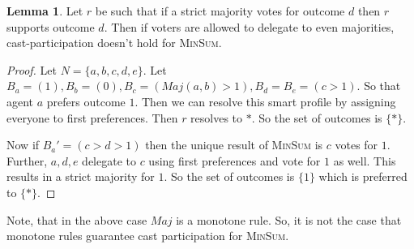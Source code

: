 \documentclass[11pt,a4paper, titlepage]{article}
\theoremstyle{definition}
\newtheorem{lemma}[theorem]{Lemma}
\begin{document}
\begin{lemma}
    Let $r$ be such that if a strict majority votes for outcome $d$ then $r$ supports outcome $d$. Then if voters are allowed to delegate to even majorities, cast-participation doesn't hold for \textsc{MinSum}. 
\end{lemma}

\begin{proof}
    Let $N = \{a, b, c, d, e\}$. Let $B_a = (1), B_b = (0), B_c = (\mathit{Maj}(a, b) > 1), B_d = B_e = (c > 1)$. So that agent $a$ prefers outcome $1$. Then we can resolve this smart profile by assigning everyone to first preferences. Then $r$ resolves to $*$. So the set of outcomes is $\{*\}$.
    
    Now if $B_a' = (c > d > 1)$ then the unique result of \textsc{MinSum} is $c$ votes for $1$. Further, $a, d, e$ delegate to $c$ using first preferences and vote for $1$ as well. This results in a strict majority for $1$. So the set of outcomes is $\{1\}$ which is preferred to $\{*\}$.
\end{proof}

Note, that in the above case $\mathit{Maj}$ is a monotone rule. So, it is not the case that monotone rules guarantee cast participation for \textsc{MinSum}.

\newpage


\end{document}
